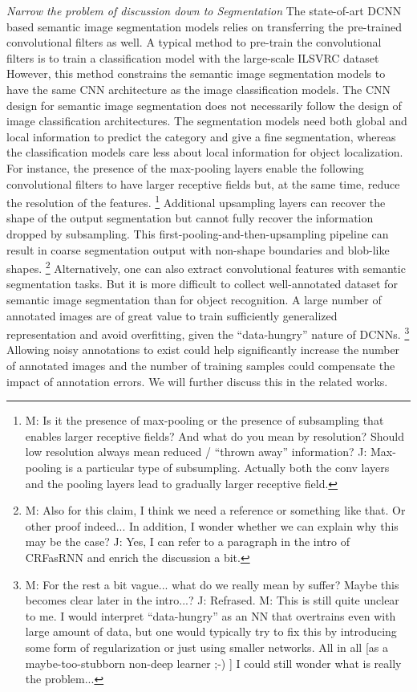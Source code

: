 \noindent \textit{Narrow the problem of discussion down to Segmentation}
The state-of-art DCNN based semantic image segmentation models relies on transferring the pre-trained convolutional filters as well.\cite{long2015fully}
A typical method to pre-train the convolutional filters is to train a classification model with the large-scale ILSVRC dataset \cite{russakovsky2015imagenet}
However, this method constrains the semantic image segmentation models to have the same CNN architecture as the image classification models.
The CNN design for semantic image segmentation does not necessarily follow the design of image classification architectures.
The segmentation models need both global and local information to predict the category and give a fine segmentation, whereas the classification models care less about local information for object localization.
For instance, the presence of the max-pooling layers enable the following convolutional filters to have larger receptive fields but, at the same time, reduce the resolution of the features.
\footnote{M: Is it the presence of max-pooling or the presence of subsampling that enables larger receptive fields?  And what do you mean by resolution?  Should low resolution always mean reduced / ``thrown away'' information? J: Max-pooling is a particular type of subsumpling. Actually both the conv layers and the pooling layers lead to gradually larger receptive field.}
Additional upsampling layers can recover the shape of the output segmentation but cannot fully recover the information dropped by subsampling.
This first-pooling-and-then-upsampling pipeline can result in coarse segmentation output \cite{chen2016deeplab} with non-shape boundaries and blob-like shapes.
\footnote{M: Also for this claim, I think we need a reference or something like that. Or other proof indeed...  In addition, I wonder whether we can explain why this may be the case? J: Yes, I can refer to a paragraph in the intro of CRFasRNN and enrich the discussion a bit.}
\noindent
Alternatively, one can also extract convolutional features with semantic segmentation tasks.
But it is more difficult to collect well-annotated dataset for semantic image segmentation than for object recognition.
A large number of annotated images are of great value to train sufficiently generalized representation and avoid overfitting, given the ``data-hungry'' nature of DCNNs.
\footnote{M: For the rest a bit vague... what do we really mean by suffer? Maybe this becomes clear later in the intro...? J: Refrased. M: This is still quite unclear to me.  I would interpret ``data-hungry'' as an NN that overtrains even with large amount of data, but one would typically try to fix this by introducing some form of regularization or just using smaller networks.  All in all [as a maybe-too-stubborn non-deep learner  ;-)  ] I could still wonder what is really the problem...}
Allowing noisy annotations to exist could help significantly increase the number of annotated images and the number of training samples could compensate the impact of annotation errors.
We will further discuss this in the related works.


